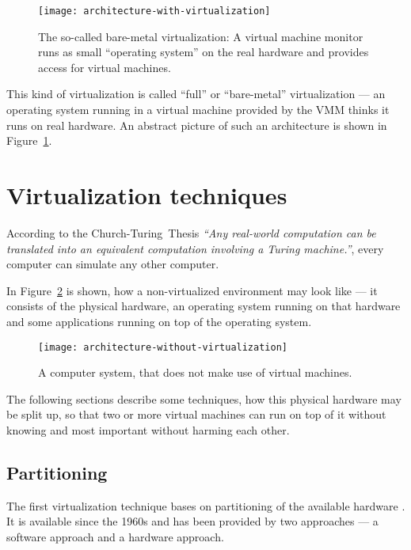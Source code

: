 \begin{figure}[htbp]
  \centering
  \texttt{[image: architecture-with-virtualization]}
  \caption[Virtualization     architecture]{The    so-called    bare-metal
    virtualization: A  virtual machine  monitor runs as  small ``operating
    system''  on  the  real  hardware  and  provides  access  for  virtual
    machines.}
  \label{fig:arch-virt}
\end{figure}

This  kind   of  virtualization  is  called   ``full''  or  ``bare-metal''
virtualization  ---  an operating  system  running  in  a virtual  machine
provided by the  VMM thinks it runs on real  hardware. An abstract picture
of such an architecture is shown in Figure~\ref{fig:arch-virt}.

\section{Virtualization techniques}
\label{sec:techniques}

According   to    the   Church-Turing~Thesis   \cite{church_turing_thesis}
\emph{``Any real-world  computation can  be translated into  an equivalent
  computation involving  a Turing machine.''}, every  computer can simulate
any other computer.

\bigskip

In Figure~\ref{fig:arch-novirt} is  shown, how a non-virtualized environment
may  look like  --- it  consists of  the physical  hardware,  an operating
system running  on that hardware and  some applications running  on top of
the operating system.

\begin{figure}[htbp]
  \centering
  \texttt{[image: architecture-without-virtualization]}
  \caption[No virtualization]{A computer system, that does not make use of
    virtual machines.}
  \label{fig:arch-novirt}
\end{figure}

The  following  sections  describe  some  techniques,  how  this  physical
hardware may be split up, so that  two or more virtual machines can run on
top of it without knowing and most important without harming each other.

\subsection{Partitioning}
\label{sec:vt-partitioning}

The first virtualization technique  bases on partitioning of the available
hardware \cite{borden89}.   It is available  since the 1960s and  has been
provided  by  two  approaches  ---  a software  approach  and  a  hardware
approach.

